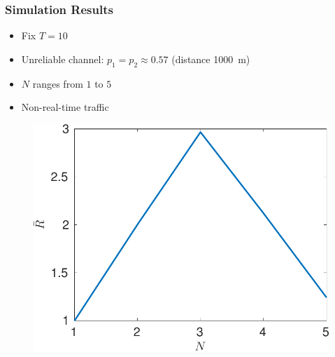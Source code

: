 \documentclass{beamer}
\begin{document}
\begin{frame}
\frametitle{Simulation Results}
\begin{itemize}
  \item Fix $T=10$
\item Unreliable channel: $p_1 = p_2 \approx 0.57$ (distance \SI{1000}{m})
\item $N$ ranges from $1$ to $5$
\item Non-real-time traffic
\end{itemize}
\begin{figure}[htbp]
  \centering
  \includegraphics[height=.5\textheight]{nonrealtime_throughput_N.pdf}
\end{figure}
\end{frame}
\end{document}
